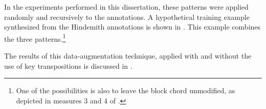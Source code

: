 
In the experiments performed in this dissertation, these
patterns were applied randomly and recursively to the
annotations. A hypothetical training example synthesized
from the Hindemith annotations is shown in
. This example combines the
three patterns.\footnote{One of the possibilities is also to
leave the block chord unmodified, as depicted in measures 3
and 4 of .}


The results of this data-augmentation technique, applied
with and without the use of key transpositions is discussed
in .
